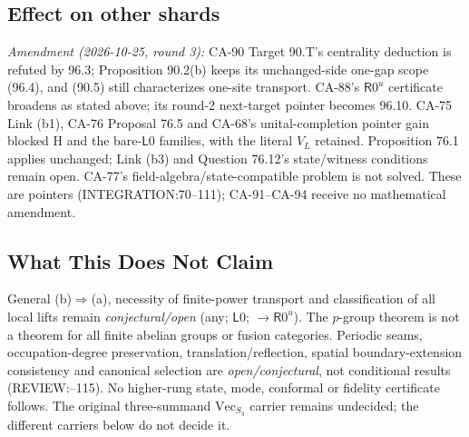 \subsection{Effect on other shards}
\emph{Amendment (2026-10-25, round 3):} CA-90 Target 90.T's centrality deduction is refuted by 96.3;
Proposition 90.2(b) keeps its unchanged-side one-gap scope (96.4), and (90.5) still characterizes one-site transport.
CA-88's \(\mathsf R0^u\) certificate broadens as stated above; its round-2 next-target pointer becomes 96.10.
CA-75 Link (b1), CA-76 Proposal 76.5 and CA-68's unital-completion pointer gain blocked H and the bare-\(\mathsf L0\)
families, with the literal \(V_L\) retained. Proposition 76.1 applies unchanged; Link (b3) and Question 76.12's
state/witness conditions remain open. CA-77's field-algebra/state-compatible problem is not solved.
These are pointers (INTEGRATION:70--111); CA-91--CA-94 receive no mathematical amendment.

\subsection{What This Does Not Claim}
General (b)\(\Rightarrow\)(a), necessity of finite-power transport and classification of all local lifts remain
\emph{conjectural/open} (any; \(\mathsf L0\); \(\to\mathsf R0^u\)). The \(p\)-group theorem is not a theorem for all
finite abelian groups or fusion categories. Periodic seams, occupation-degree preservation, translation/reflection,
spatial boundary-extension consistency and canonical selection are \emph{open/conjectural}, not conditional results
(REVIEW:--115). No higher-rung state, mode, conformal or fidelity certificate follows. The original
three-summand \(\mathrm{Vec}_{S_3}\) carrier remains undecided; the different carriers below do not decide it.

